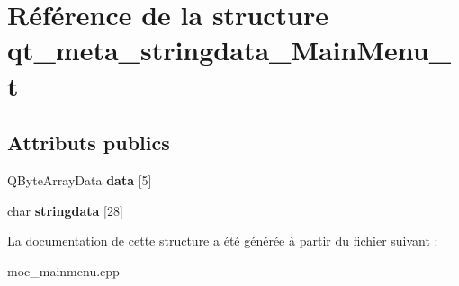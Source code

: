 \hypertarget{structqt__meta__stringdata__MainMenu__t}{\section{Référence de la structure qt\+\_\+meta\+\_\+stringdata\+\_\+\+Main\+Menu\+\_\+t}
\label{structqt__meta__stringdata__MainMenu__t}
}
\subsection*{Attributs publics}
\begin{DoxyCompactItemize}
\item 
\hypertarget{structqt__meta__stringdata__MainMenu__t_ab8fc4923fddaf974ec4ee38ee7ae308c}{Q\+Byte\+Array\+Data {\bfseries data} \mbox{[}5\mbox{]}}\label{structqt__meta__stringdata__MainMenu__t_ab8fc4923fddaf974ec4ee38ee7ae308c}

\item 
\hypertarget{structqt__meta__stringdata__MainMenu__t_adab9956acb6ea26884c267ad97651219}{char {\bfseries stringdata} \mbox{[}28\mbox{]}}\label{structqt__meta__stringdata__MainMenu__t_adab9956acb6ea26884c267ad97651219}

\end{DoxyCompactItemize}


La documentation de cette structure a été générée à partir du fichier suivant \+:\begin{DoxyCompactItemize}
\item 
moc\+\_\+mainmenu.\+cpp\end{DoxyCompactItemize}
